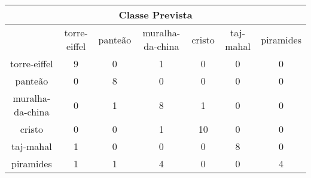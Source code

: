 \begin{tabular}{|c|c|c|c|c|c|c|}
\hline
\multicolumn{7}{|c|}{Classe Prevista}\\
\hline
 & torre-eiffel & panteão & muralha-da-china & cristo & taj-mahal & piramides\\
torre-eiffel & 9 & 0 & 1 & 0 & 0 & 0\\
panteão & 0 & 8 & 0 & 0 & 0 & 0\\
muralha-da-china & 0 & 1 & 8 & 1 & 0 & 0\\
cristo & 0 & 0 & 1 & 10 & 0 & 0\\
taj-mahal & 1 & 0 & 0 & 0 & 8 & 0\\
piramides & 1 & 1 & 4 & 0 & 0 & 4\\
\hline
\end{tabular}
